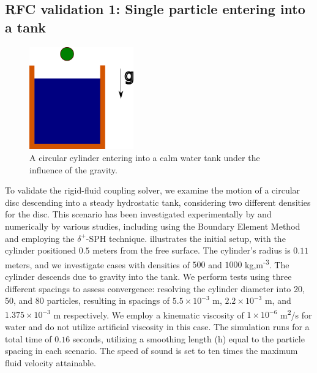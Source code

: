 \documentclass[preprint,12pt]{elsarticle}
\begin{document}
\FloatBarrier%
\subsection{RFC validation 1: Single particle entering into a tank}
\label{sec:rfc_validation_1_single_particle_entry}
\begin{figure}[!htpb]
  \centering
  \includegraphics[width=0.4\textwidth]{images/rfc_01_skillen_2013_particle_entry_in_hs_tank/Skillen_2013_particle_entry_in_hs_tank}
  \caption{A circular cylinder entering into a calm water tank under the
    influence of the gravity.}
  \label{fig:results_rfc_01_skillen_2013}
\end{figure}

To validate the rigid-fluid coupling solver, we examine the motion of a
circular disc descending into a steady hydrostatic tank, considering two
different densities for the disc. This scenario has been investigated
experimentally by
\citet{greenhow1983nonlinear} and
numerically by various studies, including
\citet{sun2006water} using the Boundary Element Method
and \cite{sun2018accurate} employing the $\delta^+$-SPH technique.
illustrates the initial setup, with the cylinder positioned $0.5$ meters from
the free surface. The cylinder's radius is $0.11$ meters, and we investigate
cases with densities of $500$ and $1000$ kg,m\textsuperscript{-3}.
The cylinder descends due to gravity into the tank. We perform tests using
three different spacings to assess convergence: resolving the cylinder
diameter into 20, 50, and 80 particles, resulting in spacings of $5.5 \times 10^{-3}$ m,
$2.2 \times 10^{-3}$ m, and $1.375 \times 10^{-3}$ m respectively. We employ a kinematic viscosity of
$1 \times 10^{-6}$ m\textsuperscript{2}/s for water and do not utilize artificial
viscosity in this case. The simulation runs for a total time of $0.16$
seconds, utilizing a smoothing length (h) equal to the particle spacing in
each scenario. The speed of sound is set to ten times the maximum fluid
velocity attainable.
\end{document}
